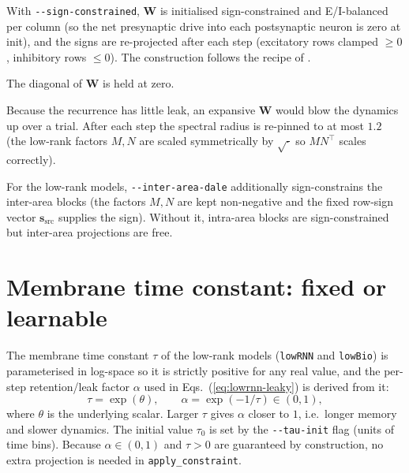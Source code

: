 \documentclass[11pt]{article}
\newcommand{\Wmat}{\mathbf{W}}
\newcommand{\code}[1]{\texttt{#1}}
\begin{document}
\begin{description}[leftmargin=1.4em]
\item[Dale's law (sign constraint).] With \code{-{}-sign-constrained}, $\Wmat$ is
initialised sign-constrained and E/I-balanced per column (so the net presynaptic
drive into each postsynaptic neuron is zero at init), and the signs are
re-projected after each step (excitatory rows clamped $\geq 0$, inhibitory rows
$\leq 0$). The construction follows the recipe of \cite{sourmpis2023}.
\item[Self-connection removal.] The diagonal of $\Wmat$ is held at zero.
\item[Spectral-radius control.] Because the recurrence has little leak, an
expansive $\Wmat$ would blow the dynamics up over a trial. After each step the
spectral radius is re-pinned to at most $1.2$ (the low-rank factors $M, N$ are
scaled symmetrically by $\sqrt{\cdot}$ so $MN^\top$ scales correctly).
\item[Inter-area Dale's law.] For the low-rank models, \code{-{}-inter-area-dale}
additionally sign-constrains the inter-area blocks (the factors $M, N$ are kept
non-negative and the fixed row-sign vector $\mathbf{s}_{\mathrm{src}}$ supplies
the sign). Without it, intra-area blocks are sign-constrained but inter-area
projections are free.
\end{description}

\section{Membrane time constant: fixed or learnable}
\label{sec:tau}
The membrane time constant $\tau$ of the low-rank models (\code{lowRNN} and
\code{lowBio}) is parameterised in log-space so it is strictly positive for any
real value, and the per-step retention/leak factor $\alpha$ used in
Eqs.~(\ref{eq:lowrnn-leaky}) is derived from it:
\begin{equation}
\tau = \exp(\theta), \qquad \alpha = \exp(-1/\tau) \in (0,1),
\end{equation}
where $\theta$ is the underlying scalar. Larger $\tau$ gives $\alpha$ closer to
$1$, i.e.\ longer memory and slower dynamics. The initial value $\tau_0$ is set by
the \code{-{}-tau-init} flag (units of time bins). Because $\alpha \in (0,1)$ and
$\tau > 0$ are guaranteed by construction, no extra projection is needed in
\code{apply\_constraint}.
\end{document}
